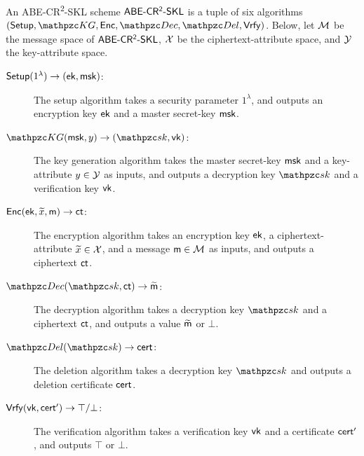 \begin{definition}\label{def:pke-cr2}
An ABE-CR\textsuperscript{2}-SKL scheme $\mathsf{ABE}\textrm{-}\mathsf{CR^2}\textrm{-}\mathsf{SKL}$ is a tuple of
six algorithms $(\Setup,\qKG, \Enc, \allowbreak\qDec,\qDel, \Vrfy)$. 
Below, let $\mathcal{M}$  be the message space of $\mathsf{ABE}\textrm{-}\mathsf{CR^2}\textrm{-}\mathsf{SKL}$, $\mathcal{X}$ be the
ciphertext-attribute space, and $\mathcal{Y}$ the key-attribute space.
\begin{description}
\item[$\mathsf{Setup}(1^\lambda)\rightarrow(\mathsf{ek},\mathsf{msk})$:] The setup algorithm takes a
    security parameter $1^\lambda$, and outputs an encryption key
    $\mathsf{ek}$ and a master secret-key $\mathsf{msk}$.

\item[$\qKG(\msk, y)\ra(\qsk,\vk)$:] The key generation algorithm takes
the master secret-key $\mathsf{msk}$ and a key-attribute $y\in \mathcal{Y}$ as inputs, and outputs a decryption key
$\qsk$ and a verification key $\mathsf{vk}$.

\item[$\mathsf{Enc}(\mathsf{ek},\widetilde{x},\mathsf{m})\rightarrow\mathsf{ct}$:] The encryption algorithm takes an
encryption key $\mathsf{ek}$, a ciphertext-attribute $\widetilde{x} \in \mathcal{X}$, and a message $\mathsf{m}
\in \mathcal{M}$ as inputs, and outputs a ciphertext $\mathsf{ct}$.

\item[$\qDec(\qsk,\ct)\ra\widetilde{\msg}$:] The decryption
    algorithm takes a decryption key $\qsk$ and a ciphertext $\mathsf{ct}$,
    and outputs a value $\widetilde{\mathsf{m}}$ or $\bot$.


\item[$\qDel(\qsk)\ra\cert$:] The deletion
algorithm takes a decryption key $\qsk$ and outputs a deletion
certificate $\mathsf{cert}$.

\item[$\mathsf{Vrfy}(\mathsf{vk}, \mathsf{cert}')\rightarrow\top/\bot$:] The verification algorithm
takes a verification key $\mathsf{vk}$ and a certificate $\mathsf{cert}'$,
and outputs $\top$ or $\bot$.



\end{description}
\end{definition}
